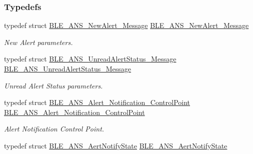 \subsubsection*{Typedefs}
\begin{DoxyCompactItemize}
\item 
typedef struct \hyperlink{struct_b_l_e___a_n_s___new_alert___message}{B\+L\+E\+\_\+\+A\+N\+S\+\_\+\+New\+Alert\+\_\+\+Message} \hyperlink{group___b_l_e___a_n_s_ga8965c1b063291f3c2d7bbfd44b6b7bec}{B\+L\+E\+\_\+\+A\+N\+S\+\_\+\+New\+Alert\+\_\+\+Message}\hypertarget{group___b_l_e___a_n_s_ga8965c1b063291f3c2d7bbfd44b6b7bec}{}\label{group___b_l_e___a_n_s_ga8965c1b063291f3c2d7bbfd44b6b7bec}

\begin{DoxyCompactList}\small\item\em New Alert parameters. \end{DoxyCompactList}\item 
typedef struct \hyperlink{struct_b_l_e___a_n_s___unread_alert_status___message}{B\+L\+E\+\_\+\+A\+N\+S\+\_\+\+Unread\+Alert\+Status\+\_\+\+Message} \hyperlink{group___b_l_e___a_n_s_ga1158b4e0fd53a48ad5a63591e4a42e0a}{B\+L\+E\+\_\+\+A\+N\+S\+\_\+\+Unread\+Alert\+Status\+\_\+\+Message}\hypertarget{group___b_l_e___a_n_s_ga1158b4e0fd53a48ad5a63591e4a42e0a}{}\label{group___b_l_e___a_n_s_ga1158b4e0fd53a48ad5a63591e4a42e0a}

\begin{DoxyCompactList}\small\item\em Unread Alert Status parameters. \end{DoxyCompactList}\item 
typedef struct \hyperlink{struct_b_l_e___a_n_s___alert___notification___control_point}{B\+L\+E\+\_\+\+A\+N\+S\+\_\+\+Alert\+\_\+\+Notification\+\_\+\+Control\+Point} \hyperlink{group___b_l_e___a_n_s_ga6475d27f07838c3a9e38ced8b7ca8826}{B\+L\+E\+\_\+\+A\+N\+S\+\_\+\+Alert\+\_\+\+Notification\+\_\+\+Control\+Point}\hypertarget{group___b_l_e___a_n_s_ga6475d27f07838c3a9e38ced8b7ca8826}{}\label{group___b_l_e___a_n_s_ga6475d27f07838c3a9e38ced8b7ca8826}

\begin{DoxyCompactList}\small\item\em Alert Notification Control Point. \end{DoxyCompactList}\item 
typedef struct \hyperlink{struct_b_l_e___a_n_s___aert_notify_state}{B\+L\+E\+\_\+\+A\+N\+S\+\_\+\+Aert\+Notify\+State} \hyperlink{group___b_l_e___a_n_s_ga38962718c3c6268631c1cdae3a41ae32}{B\+L\+E\+\_\+\+A\+N\+S\+\_\+\+Aert\+Notify\+State}\hypertarget{group___b_l_e___a_n_s_ga38962718c3c6268631c1cdae3a41ae32}{}\label{group___b_l_e___a_n_s_ga38962718c3c6268631c1cdae3a41ae32}


\end{DoxyCompactItemize}

